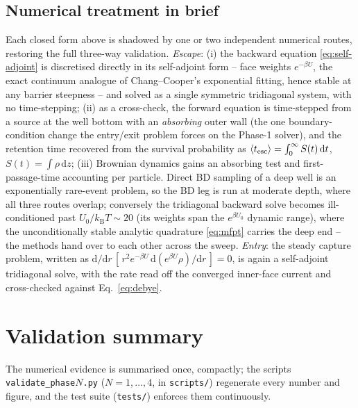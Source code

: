 \documentclass[11pt]{article}
\newcommand{\dd}{\mathrm{d}}
\newcommand{\avg}[1]{\langle #1 \rangle}
\newcommand{\kB}{k_{\mathrm{B}}}
\begin{document}
\subsection{Numerical treatment in brief}

Each closed form above is shadowed by one or two independent numerical routes, restoring the full three-way validation. \emph{Escape}: (i) the backward equation \eqref{eq:self-adjoint} is discretised directly in its self-adjoint form -- face weights $e^{-\beta U}$, the exact continuum analogue of Chang--Cooper's exponential fitting, hence stable at any barrier steepness -- and solved as a single symmetric tridiagonal system, with no time-stepping; (ii) as a cross-check, the forward equation is time-stepped from a source at the well bottom with an \emph{absorbing} outer wall (the one boundary-condition change the entry/exit problem forces on the Phase-1 solver), and the retention time recovered from the survival probability as $\avg{t_{\rm esc}} = \int_0^\infty S(t)\,\dd t$, $S(t)=\int\rho\,\dd z$; (iii) Brownian dynamics gains an absorbing test and first-passage-time accounting per particle. Direct BD sampling of a deep well is an exponentially rare-event problem, so the BD leg is run at moderate depth, where all three routes overlap; conversely the tridiagonal backward solve becomes ill-conditioned past $U_0/\kB T \sim 20$ (its weights span the $e^{\beta U_0}$ dynamic range), where the unconditionally stable analytic quadrature \eqref{eq:mfpt} carries the deep end -- the methods hand over to each other across the sweep. \emph{Entry}: the steady capture problem, written as $\dd/\dd r\,[\,r^2 e^{-\beta U}\,\dd(e^{\beta U}\rho)/\dd r\,] = 0$, is again a self-adjoint tridiagonal solve, with the rate read off the converged inner-face current and cross-checked against Eq.~\eqref{eq:debye}.

\section{Validation summary}
\label{sec:validation}

The numerical evidence is summarised once, compactly; the scripts \texttt{validate\_phase$N$.py} ($N=1,\dots,4$, in \texttt{scripts/}) regenerate every number and figure, and the test suite (\texttt{tests/}) enforces them continuously.
\end{document}
